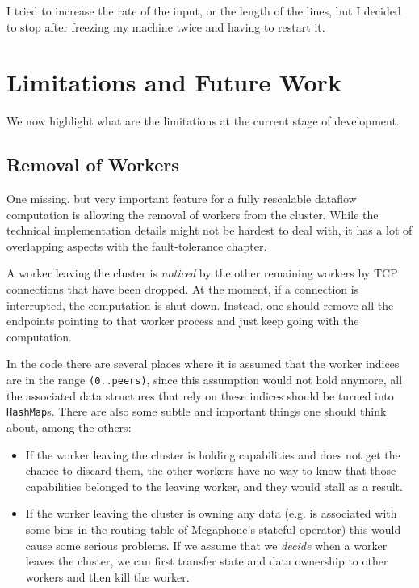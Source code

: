 \documentclass[12pt]{extarticle}
\begin{document}
I tried to increase the rate of the input, or the length of the lines, but I decided to stop after freezing my machine twice and having to restart it.

\section{Limitations and Future Work}

We now highlight what are the limitations at the current stage of development.

\subsection{Removal of Workers}
One missing, but very important feature for a fully rescalable dataflow computation is allowing the removal of workers from
the cluster. While the technical implementation details might not be hardest to deal with, it has a lot of
overlapping aspects with the fault-tolerance chapter.

A worker leaving the cluster is \textit{noticed} by the other remaining workers by TCP connections that have been dropped.
At the moment, if a connection is interrupted, the computation is shut-down. Instead, one should remove
all the endpoints pointing to that worker process and just keep going with the computation.

In the code there are several places where it is assumed that the worker indices are in the range \verb|(0..peers)|,
since this assumption would not hold anymore, all the associated data structures that rely on these indices should be turned
into \verb|HashMap|s.
There are also some subtle and important things one should think about, among the others:

\begin{itemize}
    \item If the worker leaving the cluster is holding capabilities and does not get the chance to discard them, the other
        workers have no way to know that those capabilities belonged to the leaving worker, and they would stall as a result.
    \item If the worker leaving the cluster is owning any data (e.g. is associated with some bins in the
        routing table of Megaphone's stateful operator) this would cause some serious problems.
        If we assume that we \textit{decide} when a worker leaves the cluster, we can first transfer state and data ownership to
        other workers and then kill the worker.
\end{itemize}
\end{document}

